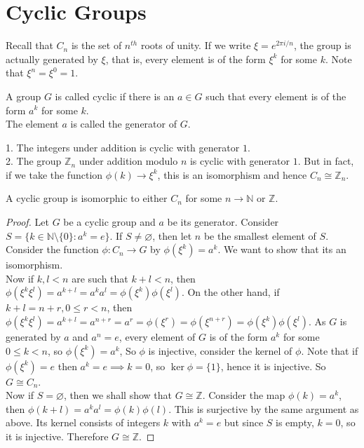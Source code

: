 \section{Cyclic Groups}
Recall that $C_n$ is the set of $n^{th}$ roots of unity.
If we write $\xi=e^{2\pi i/n}$, the group is actually generated by $\xi$, that is, every element is of the form $\xi^k$ for some $k$.
Note that $\xi^n=\xi^0=1$.
\begin{definition}
    A group $G$ is called cyclic if there is an $a\in G$ such that every element is of the form $a^k$ for some $k$.\\
    The element $a$ is called the generator of $G$.
\end{definition}
\begin{example}
    1. The integers under addition is cyclic with generator $1$.\\
    2. The group $\mathbb Z_n$ under addition modulo $n$ is cyclic with generator $1$.
    But in fact, if we take the function $\phi(k)\to\xi^k$, this is an isomorphism and hence $C_n\cong\mathbb Z_n$.
\end{example}
\begin{theorem}
    A cyclic group is isomorphic to either $C_n$ for some $n\to\mathbb N$ or $\mathbb Z$.
\end{theorem}
\begin{proof}
    Let $G$ be a cyclic group and $a$ be its generator.
    Consider $S=\{k\in\mathbb N\setminus\{0\}:a^k=e\}$.
    If $S\neq\varnothing$, then let $n$ be the smallest element of $S$.
    Consider the function $\phi:C_n\to G$ by $\phi(\xi^k)=a^k$.
    We want to show that its an isomorphism.\\
    Now if $k,l<n$ are such that $k+l<n$, then $\phi(\xi^k\xi^l)=a^{k+l}=a^ka^l=\phi(\xi^k)\phi(\xi^l)$.
    On the other hand, if $k+l=n+r,0\le r<n$, then $\phi(\xi^k\xi^l)=a^{k+l}=a^{n+r}=a^r=\phi(\xi^r)=\phi(\xi^{n+r})=\phi(\xi^k)\phi(\xi^l)$.
    As $G$ is generated by $a$ and $a^n=e$, every element of $G$ is of the form $a^k$ for some $0\le k<n$, so $\phi(\xi^k)=a^k$, So $\phi$ is injective, consider the kernel of $\phi$.
    Note that if $\phi(\xi^k)=e$ then $a^k=e\implies k=0$, so $\ker\phi=\{1\}$, hence it is injective.
    So $G\cong C_n$.\\
    Now if $S=\varnothing$, then we shall show that $G\cong\mathbb Z$.
    Consider the map $\phi(k)=a^k$, then $\phi(k+l)=a^ka^l=\phi(k)\phi(l)$.
    This is surjective by the same argument as above.
    Its kernel consists of integers $k$ with $a^k=e$ but since $S$ is empty, $k=0$, so it is injective.
    Therefore $G\cong\mathbb Z$.
\end{proof}
